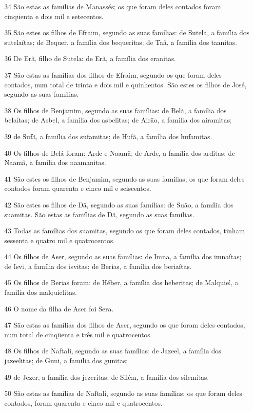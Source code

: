 \par 34 São estas as famílias de Manassés; os que foram deles contados foram cinqüenta e dois mil e setecentos.
\par 35 São estes os filhos de Efraim, segundo as suas famílias: de Sutela, a família dos sutelaítas; de Bequer, a família dos bequeritas; de Taã, a família dos taanitas.
\par 36 De Erã, filho de Sutela: de Erã, a família dos eranitas.
\par 37 São estas as famílias dos filhos de Efraim, segundo os que foram deles contados, num total de trinta e dois mil e quinhentos. São estes os filhos de José, segundo as suas famílias.
\par 38 Os filhos de Benjamim, segundo as suas famílias: de Belá, a família dos belaítas; de Asbel, a família dos asbelitas; de Airão, a família dos airamitas;
\par 39 de Sufã, a família dos sufamitas; de Hufã, a família dos hufamitas.
\par 40 Os filhos de Belá foram: Arde e Naamã; de Arde, a família dos arditas; de Naamã, a família dos naamanitas.
\par 41 São estes os filhos de Benjamim, segundo as suas famílias; os que foram deles contados foram quarenta e cinco mil e seiscentos.
\par 42 São estes os filhos de Dã, segundo as suas famílias: de Suão, a família dos suamitas. São estas as famílias de Dã, segundo as suas famílias.
\par 43 Todas as famílias dos suamitas, segundo os que foram deles contados, tinham sessenta e quatro mil e quatrocentos.
\par 44 Os filhos de Aser, segundo as suas famílias: de Imna, a família dos imnaítas; de Isvi, a família dos isvitas; de Berias, a família dos beriaítas.
\par 45 Os filhos de Berias foram: de Héber, a família dos heberitas; de Malquiel, a família dos malquielitas.
\par 46 O nome da filha de Aser foi Sera.
\par 47 São estas as famílias dos filhos de Aser, segundo os que foram deles contados, num total de cinqüenta e três mil e quatrocentos.
\par 48 Os filhos de Naftali, segundo as suas famílias: de Jazeel, a família dos jazeelitas; de Guni, a família dos gunitas;
\par 49 de Jezer, a família dos jezeritas; de Silém, a família dos silemitas.
\par 50 São estas as famílias de Naftali, segundo as suas famílias; os que foram deles contados, foram quarenta e cinco mil e quatrocentos.
